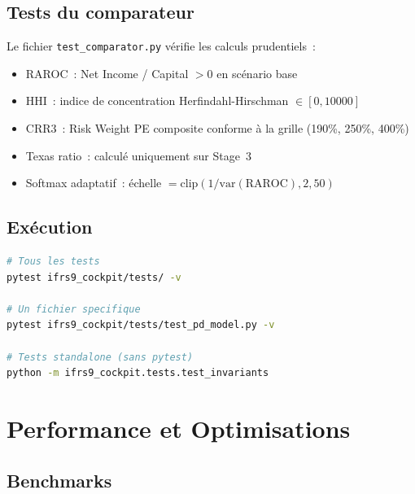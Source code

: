 \documentclass[12pt,a4paper]{article}
\begin{document}
\subsection{Tests du comparateur}

Le fichier \texttt{test\_comparator.py} v\'erifie les calculs prudentiels~:

\begin{itemize}[noitemsep]
    \item RAROC~: Net Income / Capital $> 0$ en sc\'enario base
    \item HHI~: indice de concentration Herfindahl-Hirschman $\in [0, 10000]$
    \item CRR3~: Risk Weight PE composite conforme \`a la grille (190\%, 250\%, 400\%)
    \item Texas ratio~: calcul\'e uniquement sur Stage~3
    \item Softmax adaptatif~: \'echelle $= \text{clip}(1/\text{var}(\text{RAROC}), 2, 50)$
\end{itemize}

\subsection{Ex\'ecution}

\begin{lstlisting}[language=bash]
# Tous les tests
pytest ifrs9_cockpit/tests/ -v

# Un fichier specifique
pytest ifrs9_cockpit/tests/test_pd_model.py -v

# Tests standalone (sans pytest)
python -m ifrs9_cockpit.tests.test_invariants
\end{lstlisting}


\section{Performance et Optimisations}
\label{sec:perf}

\subsection{Benchmarks}
\end{document}
